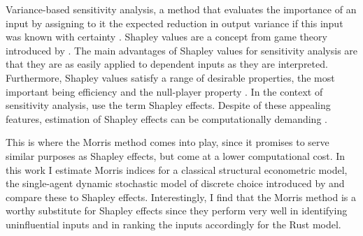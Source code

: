 Variance-based sensitivity analysis, a method that evaluates the importance of an input by assigning to it the expected reduction in output variance if this input was known with certainty \citep{BP16}. Shapley values are a concept from game theory introduced by \citet{S53}. The main advantages of Shapley values for sensitivity analysis are that they are as easily applied to dependent inputs as they are interpreted. Furthermore, Shapley values satisfy a range of desirable properties, the most important being efficiency and the null-player property \citet{S53, O14}. In the context of sensitivity analysis, \citet{SNS16} use the term Shapley effects. Despite of these appealing features, estimation of Shapley effects can be computationally demanding \citep{SNS16}.

This is where the Morris method comes into play, since it promises to serve similar purposes as Shapley effects, but come at a lower computational cost. In this work I estimate Morris indices for a classical structural econometric model, the single-agent dynamic stochastic model of discrete choice introduced by \citet{R87} and compare these to Shapley effects. Interestingly, I find that the Morris method is a worthy substitute for Shapley effects since they perform very well in identifying uninfluential inputs and in ranking the inputs accordingly for the Rust model.

